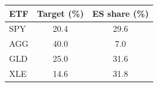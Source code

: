 \begin{tabular}{@{}lS[table-format=2.1]S[table-format=2.1]@{}}
\toprule
ETF & {Target (\%)} & {ES share (\%)} \\
\midrule
SPY & 20.4 & 29.6 \\
AGG & 40.0 & 7.0 \\
GLD & 25.0 & 31.6 \\
XLE & 14.6 & 31.8 \\
\bottomrule
\end{tabular}
